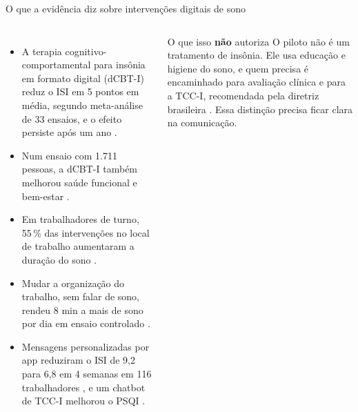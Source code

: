 \documentclass[aspectratio=169,10pt]{beamer}
\begin{document}
\begin{frame}{O que a evidência diz sobre intervenções digitais de sono}
\begin{columns}[T,onlytextwidth]
\footnotesize
\begin{itemize}
  \item A terapia cognitivo-comportamental para insônia em formato digital
    (dCBT-I) reduz o ISI em 5 pontos em média, segundo meta-análise de 33
    ensaios, e o efeito persiste após um ano \parencite{soh2020,zachariae2016}.
  \item Num ensaio com 1.711 pessoas, a dCBT-I também melhorou saúde
    funcional e bem-estar \parencite{espie2019}.
  \item Em trabalhadores de turno, 55\,\% das intervenções no local de
    trabalho aumentaram a duração do sono \parencite{robbins2021,redeker2019}.
  \item Mudar a organização do trabalho, sem falar de sono, rendeu 8 min a
    mais de sono por dia em ensaio controlado \parencite{olson2015}.
  \item Mensagens personalizadas por app reduziram o ISI de 9,2 para 6,8
    em 4 semanas em 116 trabalhadores \parencite{shimamoto2022}, e um
    chatbot de TCC-I melhorou o PSQI \parencite{chiu2025}.
\end{itemize}
\begin{alertblock}{O que isso \textbf{não} autoriza}
\scriptsize O piloto não é um tratamento de insônia. Ele usa educação e
higiene do sono, e quem precisa é encaminhado para avaliação clínica e
para a TCC-I, recomendada pela diretriz brasileira \parencite{drager2023}.
Essa distinção precisa ficar clara na comunicação.
\end{alertblock}
\end{columns}
\end{frame}
\end{document}
